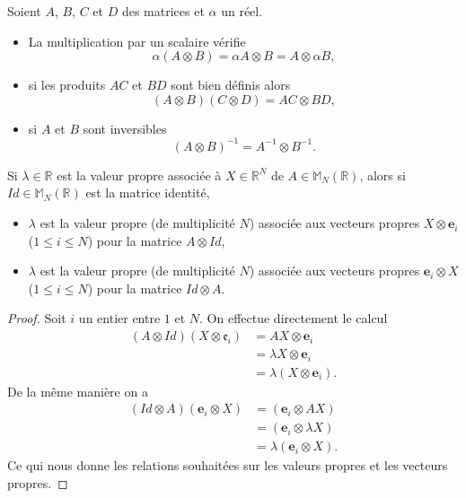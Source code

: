 \begin{proposition}
Soient $A$, $B$, $C$ et $D$ des matrices et $\alpha$ un réel.
\begin{itemize}
\item La multiplication par un scalaire vérifie
\begin{equation}
\alpha ( A \otimes B ) = \alpha A \otimes B = A \otimes \alpha B,
\end{equation}

\item si les produits $AC$ et $BD$ sont bien définis alors
\begin{equation}
(A \otimes B ) (C \otimes D) = AC \otimes BD,
\end{equation} 


\item si $A$ et $B$ sont inversibles
\begin{equation}
(A \otimes B)^{-1} = A^{-1} \otimes B^{-1}.
\end{equation}
\end{itemize}
\label{prop:pdt_kron}
\end{proposition}

\begin{proposition}
Si $\lambda \in \mathbb{R}$ est la valeur propre associée à $X \in \mathbb{R}^N$ de $A \in \mathbb{M}_N ( \mathbb{R} )$, alors si $Id \in \mathbb{M}_N ( \mathbb{R} )$ est la matrice identité,
\begin{itemize}
\item $\lambda$ est la valeur propre (de multiplicité $N$) associée aux vecteurs propres $X \otimes \mathbf{e}_i$ ($1 \leq i \leq N$) pour la matrice $A \otimes Id$,

\item $\lambda$ est la valeur propre (de multiplicité $N$) associée aux vecteurs propres $\mathbf{e}_i \otimes X$ ($1 \leq i \leq N$) pour la matrice $Id \otimes A$.
\end{itemize}
\label{prop:eigen_pdtkron}
\end{proposition}

\begin{proof}
Soit $i$ un entier entre $1$ et $N$.
On effectue directement le calcul
\begin{align*}
(A \otimes Id) (X \otimes \mathfrak{e}_i) & = AX \otimes \mathbf{e}_i \\
	& = \lambda X \otimes \mathbf{e}_i \\
	& = \lambda (X \otimes \mathbf{e}_i).
\end{align*}
De la même manière on a 
\begin{align*}
(Id \otimes A) (\mathbf{e}_i \otimes X) & = (\mathbf{e}_i \otimes AX) \\
	& = (\mathbf{e}_i \otimes \lambda X ) \\
	& = \lambda (\mathbf{e}_i \otimes X ).
\end{align*}
Ce qui nous donne les relations souhaitées sur les valeurs propres et les vecteurs propres.
\end{proof}







